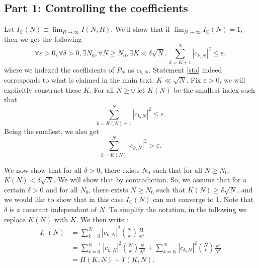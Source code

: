 \documentclass[aps,prl,showpacs,twocolumn]{revtex4-2}
\providecommand{\be}{\begin{equation}}
\providecommand{\ee}{\end{equation}}
\providecommand{\be}{\begin{equation}}
\providecommand{\ee}{\end{equation}}
\providecommand{\be}{\begin{equation}}
\providecommand{\ee}{\end{equation}}
\providecommand{\be}{\begin{equation}}
\providecommand{\ee}{\end{equation}}
\begin{document}
\subsection{Part 1: Controlling the coefficients}

Let $I_{\mathbb{C}}(N) \equiv \lim_{R \rightarrow \infty} I(N,R)$.
We'll show that if $\lim_{N\rightarrow \infty} I_{\mathbb{C}}(N) = 1$, then we get the following
\be\label{sta} \forall \varepsilon > 0, \forall \delta > 0, \exists N_0, \forall N \geq N_0, \exists K < \delta\sqrt{N}, \sum_{k=K+1}^N |c_{k,N}|^2 \leq \varepsilon, \ee
where we indexed the coefficients of $P_N$ as $c_{k,N}$. Statement \eqref{sta} indeed corresponds to what is claimed in the main text: $K \ll \sqrt{N}$.\newline
Fix $\varepsilon > 0$, we will explicitly construct these $K$. For all $N \geq 0$ let
$K(N)$ be the smallest index such that
\[ \sum_{k=K(N)+1}^N |c_{k,N}|^2 \leq \varepsilon. \]
Being the smallest, we also get
\[ \sum_{k=K(N)}^N |c_{k,N}|^2 > \varepsilon. \]

We now show that for all $\delta > 0$, there exists $N_0$ such that for all $N \geq N_0$,
$K(N) < \delta \sqrt{N}$.\newline
We will show that by contradiction. So, we assume that for a certain $\delta > 0$ and for all $N_0$, there exists $N \geq N_0$
such that $K(N) \geq \delta \sqrt{N}$, and we would like to show that in this case $I_{\mathbb{C}}(N)$ can not converge to 1.
Note that $\delta$ is a constant independant of $N$.\newline
To simplify the notation, in the following we replace $K(N)$ with $K$. We then write :
\begin{align*}
    I_{\mathbb{C}}(N) &= \sum_{k=0}^N |c_{k,N}|^2 \binom{N}{k}\frac{k!}{N^k}\\
    &= \sum_{k=0}^{K-1} |c_{k,N}|^2 \binom{N}{k}\frac{k!}{N^k} + \sum_{k=K}^N |c_{k,N}|^2 \binom{N}{k}\frac{k!}{N^k}\\
    &= H(K, N) + T(K, N).
\end{align*}
\end{document}
